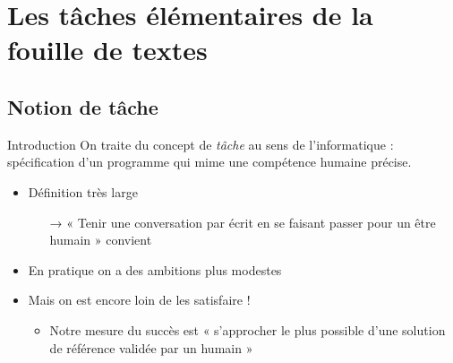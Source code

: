 \documentclass[hyperref={unicode}, xcolor={svgnames}]{beamer}
\begin{document}

\section{Les tâches élémentaires de la fouille de textes}

\subsection{Notion de tâche}

\begin{frame}{Introduction}
    On traite du concept de \textit{tâche} au sens de l'informatique : spécification d'un programme qui mime une compétence humaine précise.

    \begin{itemize}
        \item Définition très large
            \begin{itemize}
                \item[→] « Tenir une conversation par écrit en se faisant passer pour un être humain » convient
            \end{itemize}
        \item En pratique on a des ambitions plus modestes
        \item Mais on est encore loin de les satisfaire !
         \begin{itemize}
             \item Notre mesure du succès est « s'approcher le plus possible d'une solution de référence validée par un humain »
         \end{itemize}
    \end{itemize}
 \end{frame}
\end{document}
